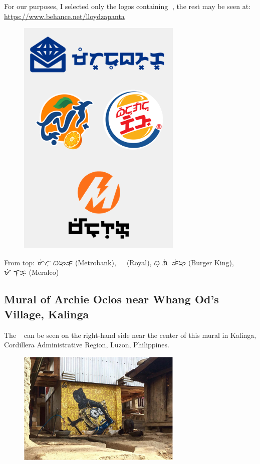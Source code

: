 \documentclass[a4paper,pagesize,openany,14pt,parskip=never]{scrbook}
\newcommand{\≈}{$\approx$}
\newcommand{\ra}{{\baybayin ᜍ}}
\begin{document}
For our purposes, I selected only the logos containing \ra, the rest may be seen at: \url{https://www.behance.net/lloydzapanta}

\begin{figure}[H]
\includegraphics[width=0.7\textwidth]{logos}
\end{figure}

From top: {\baybayin ᜋᜒᜆ᜔ᜍᜓᜊᜅ᜔ᜃ᜔} (Metrobank), {\baybayin ᜍᜓᜌᜎ᜔} (Royal), {\baybayin ᜊᜓᜍ᜔ᜄᜒᜍ᜔ ᜃᜒᜅ᜔} (Burger King), {\baybayin ᜋᜒᜍᜎ᜔ᜃᜓ} (Meralco)

\subsection{Mural of Archie Oclos near Whang Od's Village, Kalinga}

The \ra\ can be seen on the right-hand side near the center of this mural in Kalinga, Cordillera Administrative Region, Luzon, Philippines.

\begin{figure}[H]
\includegraphics[width=0.7\textwidth]{Kalinga}
\end{figure}
\end{document}
